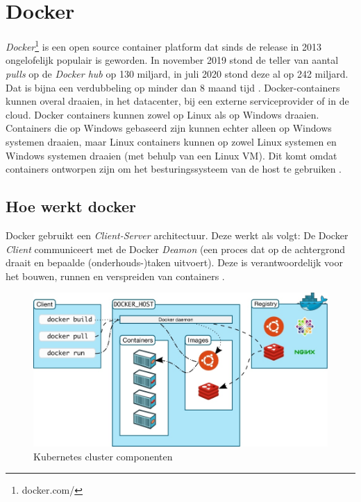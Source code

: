 \section{Docker}
\textit{Docker}\footnote{docker.com/} is een open source container platform dat sinds de release in 2013 ongelofelijk populair is geworden. In november 2019 stond de teller van aantal \textit{pulls} op de \textit{Docker hub} op 130 miljard, in juli 2020 stond deze al op 242 miljard. Dat is bijna een verdubbeling op minder dan 8 maand tijd \autocite{Kreisa2020}. Docker-containers kunnen overal draaien, in het datacenter, bij een externe serviceprovider of in de cloud. Docker containers kunnen zowel op Linux als op Windows draaien. Containers die op Windows gebaseerd zijn kunnen echter alleen op Windows systemen draaien, maar Linux containers kunnen op zowel Linux systemen en Windows systemen draaien (met behulp van een Linux VM). Dit komt omdat containers ontworpen zijn om het besturingssysteem van de host te gebruiken \autocite{Anil2018}.


\subsection{Hoe werkt docker}
Docker gebruikt een \textit{Client-Server} architectuur. Deze werkt als volgt: De Docker \textit{Client} communiceert met de Docker \textit{Deamon} (een proces dat op de achtergrond draait en bepaalde (onderhouds-)taken uitvoert). Deze is verantwoordelijk voor het bouwen, runnen en verspreiden van containers \autocite{Docker2021a}.

\begin{figure}[ht]
	\centering
	\includegraphics[width=\linewidth]{img/dockerArchitecture.jpg}
	\caption{Kubernetes cluster componenten \autocite{Docker2021a}}
	\label{fig:dockerArch}
\end{figure}

